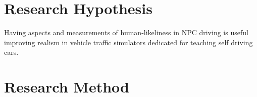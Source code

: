 \documentclass{VUMIFPS-master-intro}
\begin{document}
\section{Research Hypothesis}

Having aspects and measurements of human-likeliness in NPC driving is useful improving realism in vehicle traffic simulators dedicated for teaching self driving cars.

\section{Research Method}
%
\end{document}
